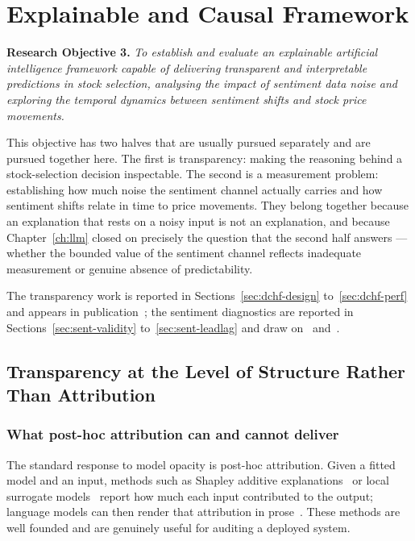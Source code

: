 \chapter{Explainable and Causal Framework}
\label{ch:causal}

\textbf{Research Objective 3.} \emph{To establish and evaluate an explainable artificial
intelligence framework capable of delivering transparent and interpretable predictions in stock
selection, analysing the impact of sentiment data noise and exploring the temporal dynamics
between sentiment shifts and stock price movements.}

\vspace{0.4em}
This objective has two halves that are usually pursued separately and are pursued together here.
The first is transparency: making the reasoning behind a stock-selection decision inspectable.
The second is a measurement problem: establishing how much noise the sentiment channel actually
carries and how sentiment shifts relate in time to price movements. They belong together because
an explanation that rests on a noisy input is not an explanation, and because
Chapter~\ref{ch:llm} closed on precisely the question that the second half answers --- whether the
bounded value of the sentiment channel reflects inadequate measurement or genuine absence of
predictability.

The transparency work is reported in Sections~\ref{sec:dchf-design} to~\ref{sec:dchf-perf} and
appears in publication~; the sentiment diagnostics are reported in
Sections~\ref{sec:sent-validity} to~\ref{sec:sent-leadlag} and draw on~
and~.

\section{Transparency at the Level of Structure Rather Than Attribution}
\label{sec:dchf-rationale}

\subsection{What post-hoc attribution can and cannot deliver}

The standard response to model opacity is post-hoc attribution. Given a fitted model and an
input, methods such as Shapley additive explanations~\cite{lundberg2017} or local surrogate
models~\cite{ribeiro2016} report how much each input contributed to the output; language models
can then render that attribution in prose~\cite{koa2024}. These methods are well founded and are
genuinely useful for auditing a deployed system.

